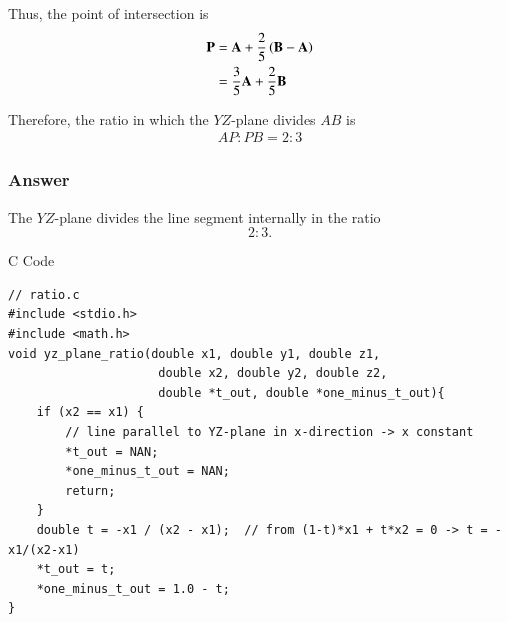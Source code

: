 \documentclass{beamer}
\begin{document}
\begin{frame}

Thus, the point of intersection is
\begin{align}
\mathbf{P} &= \mathbf{A} + \frac{2}{5}\left(\mathbf{B}-\mathbf{A}\right) \\
&= \frac{3}{5}\mathbf{A} + \frac{2}{5}\mathbf{B}
\end{align}

Therefore, the ratio in which the $YZ$-plane divides $AB$ is
\begin{align}
AP : PB = 2 : 3
\end{align}

\end{frame}

\begin{frame}
\frametitle{Answer}
The $YZ$-plane divides the line segment internally in the ratio 
\[
\boxed{2:3}.
\]
\end{frame}

\begin{frame}[fragile]{C Code}
\begin{lstlisting}
// ratio.c
#include <stdio.h>
#include <math.h>
void yz_plane_ratio(double x1, double y1, double z1,
                     double x2, double y2, double z2,
                     double *t_out, double *one_minus_t_out){
    if (x2 == x1) {
        // line parallel to YZ-plane in x-direction -> x constant
        *t_out = NAN;
        *one_minus_t_out = NAN;
        return;
    }
    double t = -x1 / (x2 - x1);  // from (1-t)*x1 + t*x2 = 0 -> t = -x1/(x2-x1)
    *t_out = t;
    *one_minus_t_out = 1.0 - t;
}
  \end{lstlisting}
\end{frame}
\end{document}
